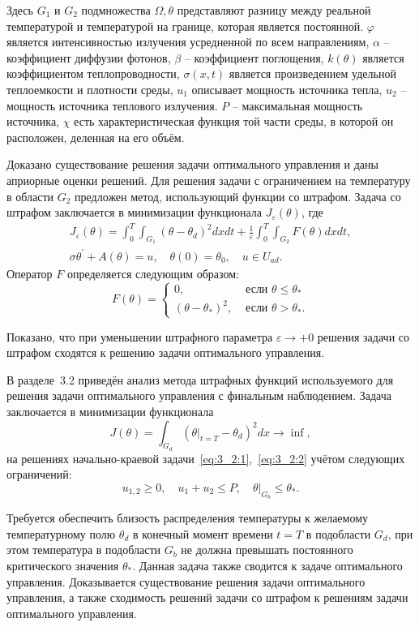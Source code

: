 Здесь $G_{1}$ и $G_{2}$ подмножества $\Omega, \theta$
представляют разницу между реальной температурой
и температурой на границе, которая является постоянной.
$\varphi$ является интенсивностью излучения усредненной по всем направлениям,
$\alpha$ -- коэффициент диффузии фотонов, $\beta$ -- коэффициент поглощения,
$k(\theta)$ является коэффициентом теплопроводности, $\sigma(x, t)$
является произведением удельной теплоемкости и плотности среды, $u_{1}$
описывает мощность источника тепла, $u_{2}$ -- мощность источника теплового излучения.
$P$ -- максимальная мощность источника,
$\chi$ есть характеристическая функция той части среды,
в которой он расположен, деленная на его объём.


Доказано существование решения задачи оптимального
управления и даны априорные оценки решений.
Для решения задачи с ограничением на температуру в области $G_2$
предложен метод, использующий функции со штрафом.
Задача со штрафом заключается в минимизации функционала $J_{\varepsilon}(\theta)$,
где
\begin{gather*}
    J_{\varepsilon}(\theta)=\int_{0}^{T}
    \int_{G_{1}}\left(\theta-\theta_{d}\right)^{2} dx dt
    +\frac{1}{\varepsilon} \int_{0}^{T}
    \int_{G_{2}} F(\theta) d x d t, \\
    \sigma \theta^{\prime}+A(\theta)=u,
    \quad \theta(0)=\theta_{0}, \quad u \in U_{a d}.
\end{gather*}
Оператор $F$ определяется следующим образом:
\[
    F(\theta)=
    \begin{cases}
        0, & \text { если } \theta \leq \theta_{*} \\
        \left(\theta-\theta_{*}\right)^{2},
        & \text { если } \theta>\theta_{*}.
    \end{cases}
\]


Показано, что при уменьшении штрафного параметра $\varepsilon \rightarrow +0$
решения задачи со штрафом сходятся к решению задачи оптимального управления.

В разделе~3.2 приведён анализ метода штрафных функций используемого
для решения задачи оптимального управления с финальным наблюдением.
Задача заключается в минимизации функционала
\[
    J(\theta)=\int_{G_{d}}\left(\left.\theta\right|_{t=T}
    -\theta_{d}\right)^{2} d x \rightarrow \inf,
\]
на решениях начально-краевой задачи~\eqref{eq:3_2:1},~\eqref{eq:3_2:2}
учётом следующих ограничений:
\[
    u_{1,2} \geq 0, \quad u_{1}+u_{2} \leq P,\left.\quad \theta\right|_{G_{b}} \leq \theta_{*}.
\]

Требуется обеспечить близость распределения температуры к желаемому температурному полю $\theta_{d}$
в конечный момент времени $t=T$ в подобласти $G_{d}$, при этом температура в подобласти $G_{b}$
не должна превышать постоянного критического значения $\theta_{*}$.
Данная задача также сводится к задаче оптимального управления.
Доказывается существование решения задачи оптимального управления, а также
сходимость решений задачи со штрафом к решениям задачи оптимального управления.


